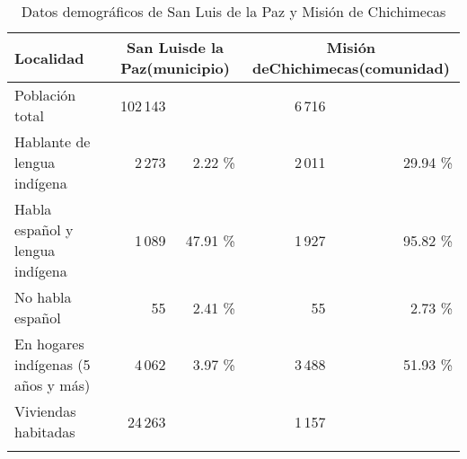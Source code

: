 \documentclass[output=paper]{../langscibook}
\begin{document}
%

\begin{table}
\caption{\label{tab:guerrero:4} Datos demográficos de San Luis  de la Paz y Misión de Chichimecas \citep{INEGI2010}}
\begin{tabularx}{\textwidth}{lrrrr}
\lsptoprule
Localidad & \multicolumn{2}{c}{\parbox{2cm}{San Luis\newline  de la Paz\newline (municipio)}} & \multicolumn{2}{c}{\parbox{2.5cm}{Misión de\newline  Chichimecas\newline  (comunidad)}}\\
\midrule
Población total &  102\,143 && 6\,716 &\\
Hablante de lengua indígena&  2\,273 &2.22 \%& 2\,011 & 29.94 \%\\
Habla español y lengua indígena & 1\,089 &47.91 \%& 1\,927 & 95.82 \% \\
No habla español & 55 & 2.41 \% &  55 & 2.73 \% \\
En hogares indígenas (5 años y más)& 4\,062 & 3.97 \%&  3\,488 & 51.93 \% \\
Viviendas habitadas & 24\,263  &&  1\,157 & \\
\lspbottomrule
\end{tabularx}
\end{table}
\end{document}
